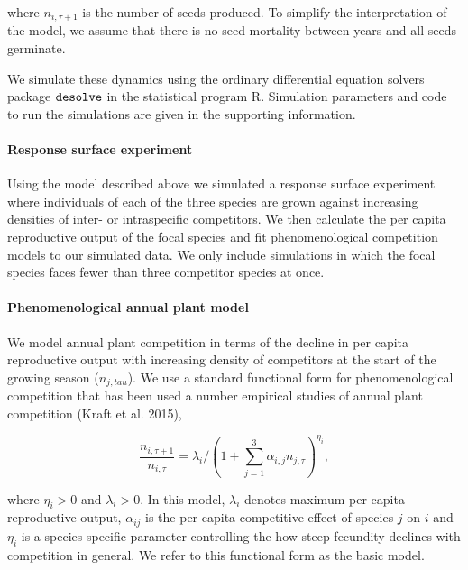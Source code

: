 \documentclass[12pt,]{article}
\let\oldparagraph\paragraph
\renewcommand{\paragraph}[1]{\oldparagraph{#1}\mbox{}}
\begin{document}
where \(n_{i,\tau+1}\) is the number of seeds produced. To simplify the
interpretation of the model, we assume that there is no seed mortality
between years and all seeds germinate.

We simulate these dynamics using the ordinary differential equation
solvers package \(\tt{desolve}\) in the statistical program R.
Simulation parameters and code to run the simulations are given in the
supporting information.

\paragraph{Response surface
experiment}\label{response-surface-experiment}

Using the model described above we simulated a response surface
experiment where individuals of each of the three species are grown
against increasing densities of inter- or intraspecific competitors. We
then calculate the per capita reproductive output of the focal species
and fit phenomenological competition models to our simulated data. We
only include simulations in which the focal species faces fewer than
three competitor species at once.

\paragraph{Phenomenological annual plant
model}\label{phenomenological-annual-plant-model}

We model annual plant competition in terms of the decline in per capita
reproductive output with increasing density of competitors at the start
of the growing season (\(n_{j,tau}\)). We use a standard functional form
for phenomenological competition that has been used a number empirical
studies of annual plant competition (Kraft et al. 2015),

\vspace{-1em}

\begin{equation} \label{eqBeverton}
\frac{ n_{i,\tau+1} }{ n_{i,\tau} } = \lambda_{i}/(1 + \sum^3_{j=1} \alpha_{i,j} n_{j,\tau})^{ \eta_i } ,
\end{equation}

where \(\eta_{i} > 0\) and \(\lambda_i > 0\). In this model,
\(\lambda_i\) denotes maximum per capita reproductive output,
\(\alpha_{ij}\) is the per capita competitive effect of species \(j\) on
\(i\) and \(\eta_i\) is a species specific parameter controlling the how
steep fecundity declines with competition in general. We refer to this
functional form as the basic model.
\end{document}
